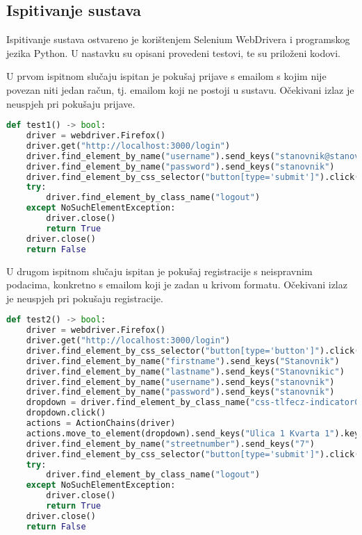 			\subsection{Ispitivanje sustava}

			Ispitivanje sustava ostvareno je korištenjem Selenium WebDrivera i programskog jezika Python. U nastavku su opisani provedeni testovi, te su priloženi kodovi.

			U prvom ispitnom slučaju ispitan je pokušaj prijave s emailom s kojim nije povezan niti jedan račun, tj. emailom koji ne postoji u sustavu. Očekivani izlaz je neuspjeh pri pokušaju prijave.

			\begin{lstlisting}[language=Python, breaklines=true]
def test1() -> bool:
    driver = webdriver.Firefox()
    driver.get("http://localhost:3000/login")
    driver.find_element_by_name("username").send_keys("stanovnik@stanovnik.com")
    driver.find_element_by_name("password").send_keys("stanovnik")
    driver.find_element_by_css_selector("button[type='submit']").click()
    try:
        driver.find_element_by_class_name("logout")
    except NoSuchElementException:
        driver.close()
        return True
    driver.close()
    return False
			\end{lstlisting}

			U drugom ispitnom slučaju ispitan je pokušaj registracije s neispravnim podacima, konkretno s emailom koji je zadan u krivom formatu. Očekivani izlaz je neuspjeh pri pokušaju registracije.

			\begin{lstlisting}[language=Python, breaklines=true]
def test2() -> bool:
    driver = webdriver.Firefox()
    driver.get("http://localhost:3000/login")
    driver.find_element_by_css_selector("button[type='button']").click()
    driver.find_element_by_name("firstname").send_keys("Stanovnik")
    driver.find_element_by_name("lastname").send_keys("Stanovnikic")
    driver.find_element_by_name("username").send_keys("stanovnik")
    driver.find_element_by_name("password").send_keys("stanovnik")
    dropdown = driver.find_element_by_class_name("css-tlfecz-indicatorContainer")
    dropdown.click()
    actions = ActionChains(driver)
    actions.move_to_element(dropdown).send_keys("Ulica 1 Kvarta 1").key_down(Keys.ENTER).key_up(Keys.ENTER).perform()
    driver.find_element_by_name("streetnumber").send_keys("7")
    driver.find_element_by_css_selector("button[type='submit']").click()
    try:
        driver.find_element_by_class_name("logout")
    except NoSuchElementException:
        driver.close()
        return True
    driver.close()
    return False
			\end{lstlisting}

